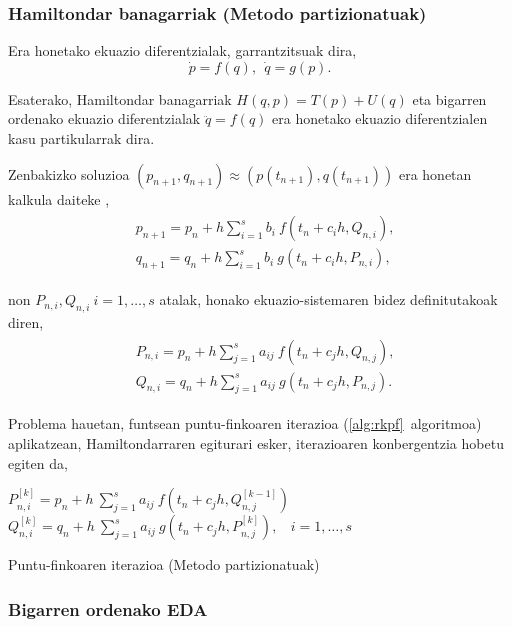 \subsubsection*{Hamiltondar banagarriak (Metodo partizionatuak)}

Era honetako ekuazio diferentzialak, garrantzitsuak dira,
\begin{equation*}
\dot{p}=f(q), \ \ \dot{q}=g(p).
\end{equation*}

Esaterako, Hamiltondar banagarriak $H(q,p)=T(p)+U(q)$ eta bigarren ordenako ekuazio diferentzialak $\ddot{q}=f(q)$ era honetako ekuazio diferentzialen kasu partikularrak dira.

Zenbakizko soluzioa $(p_{n+1},q_{n+1}) \approx (p(t_{n+1}),q(t_{n+1}))$ era honetan kalkula daiteke \cite{JMSanz-Serna1994},
\begin{align}
\begin{split}
&p_{n+1}=p_n+ h \sum\limits_{i=1}^{s} b_i \ f(t_n+c_ih,Q_{n,i}),\\
&q_{n+1}=q_n+ h \sum\limits_{i=1}^{s} b_i \ g(t_n+c_ih,P_{n,i}),
\end{split}
\end{align}

non $P_{n,i},Q_{n,i} \ i=1,\dots,s$ atalak, honako ekuazio-sistemaren bidez definitutakoak diren, 
\begin{align}
\begin{split}
&P_{n,i} =p_n+ h \sum\limits_{j=1}^{s} a_{ij} \ f(t_n+c_jh,Q_{n,j}), \\
&Q_{n,i} =q_n+ h \sum\limits_{j=1}^{s} a_{ij} \ g(t_n+c_jh,P_{n,j}).
\end{split}
\end{align}

Problema hauetan,  funtsean puntu-finkoaren iterazioa (\ref{alg:rkpf}~algoritmoa) aplikatzean, Hamiltondarraren egiturari esker, iterazioaren konbergentzia hobetu egiten da,   

\begin{algorithm}[H]
  {
  \BlankLine
   $P_{n,i}^{[k]}=p_{n}+ h \ \sum\limits_{j=1}^{s} a_{ij} \ f(t_n+c_jh,Q_{n,j}^{[k-1]})$\; 
   $Q_{n,i}^{[k]}=q_{n}+ h \ \sum\limits_{j=1}^{s} a_{ij} \ g(t_n+c_jh,P_{n,j}^{[k]}), \ \ \ \ i=1,\dots,s $\; 
  }
 \caption{Puntu-finkoaren iterazioa (Metodo partizionatuak)}
 \label{alg:rkfppart}
\end{algorithm}


\subsubsection*{Bigarren ordenako EDA}

